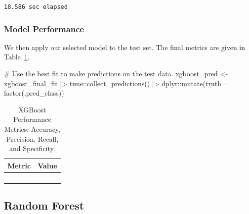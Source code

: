 \documentclass[
  letterpaper,
  DIV=11,
  numbers=noendperiod]{scrartcl}
\newenvironment{Shaded}{\begin{snugshade}}{\end{snugshade}}
\newcommand{\AttributeTok}[1]{\textcolor[rgb]{0.40,0.45,0.13}{#1}}
\newcommand{\CommentTok}[1]{\textcolor[rgb]{0.37,0.37,0.37}{#1}}
\newcommand{\FunctionTok}[1]{\textcolor[rgb]{0.28,0.35,0.67}{#1}}
\newcommand{\NormalTok}[1]{\textcolor[rgb]{0.00,0.23,0.31}{#1}}
\newcommand{\OtherTok}[1]{\textcolor[rgb]{0.00,0.23,0.31}{#1}}
\newcommand{\SpecialCharTok}[1]{\textcolor[rgb]{0.37,0.37,0.37}{#1}}
\begin{document}
\begin{verbatim}
18.586 sec elapsed
\end{verbatim}

\subsubsection{Model Performance}\label{model-performance-4}

We then apply our selected model to the test set. The final metrics are
given in Table~\ref{tbl-xgboost-performance}.

\begin{Shaded}
\begin{Highlighting}[]
\CommentTok{\# Use the best fit to make predictions on the test data.}
\NormalTok{xgboost\_pred }\OtherTok{\textless{}{-}} 
\NormalTok{  xgboost\_final\_fit }\SpecialCharTok{|\textgreater{}} 
\NormalTok{  tune}\SpecialCharTok{::}\FunctionTok{collect\_predictions}\NormalTok{() }\SpecialCharTok{|\textgreater{}}
\NormalTok{  dplyr}\SpecialCharTok{::}\FunctionTok{mutate}\NormalTok{(}\AttributeTok{truth =} \FunctionTok{factor}\NormalTok{(.pred\_class))}
\end{Highlighting}
\end{Shaded}

\begin{longtable}{>{\raggedright\arraybackslash}p{}>{\raggedleft\arraybackslash}p{}}

\caption{\label{tbl-xgboost-performance}XGBoost Performance Metrics:
Accuracy, Precision, Recall, and Specificity.}

\tabularnewline

\toprule
Metric & Value \\ 
\midrule\addlinespace[2.5pt]
\cellcolor[HTML]{FFFFFF}{Accuracy} & \cellcolor[HTML]{FFFFFF}{91.2} \\ 
\cellcolor[HTML]{FFFFFF}{Precision} & \cellcolor[HTML]{FFFFFF}{73.1} \\ 
\cellcolor[HTML]{FFFFFF}{Recall} & \cellcolor[HTML]{FFFFFF}{95.0} \\ 
\cellcolor[HTML]{FFFFFF}{Specificity} & \cellcolor[HTML]{FFFFFF}{90.1} \\ 
\bottomrule

\end{longtable}

\subsection{Random Forest}\label{random-forest}
\end{document}
